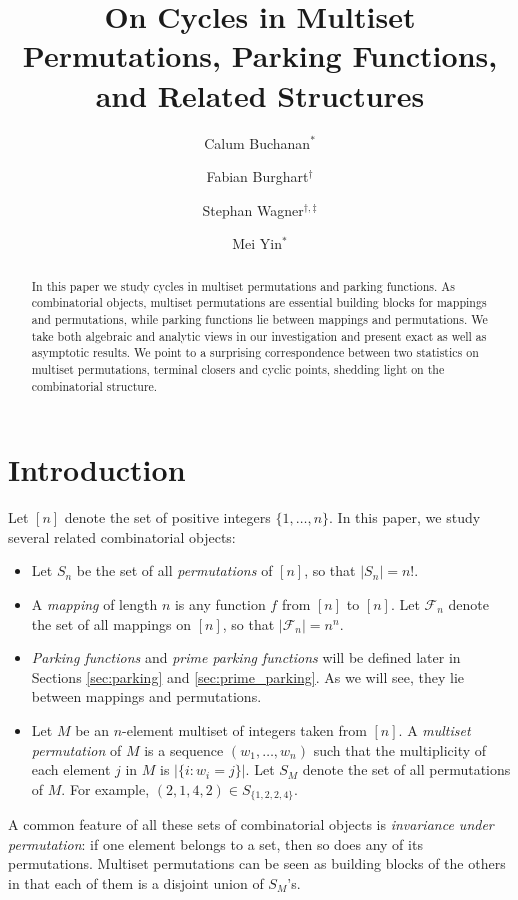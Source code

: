 \documentclass[letterpaper]{amsart}
\title[Cycles in Multiset Permutations and Parking Functions]{On Cycles in Multiset Permutations, Parking Functions, and Related Structures}
\author[C. Buchanan]{Calum {Buchanan}$^*$}
\author[F. Burghart]{Fabian {Burghart}$^\dag$}
\author[S. Wagner]{Stephan {Wagner}$^{\dag, \ddag}$}
\author[M. Yin]{Mei {Yin}$^*$}
\theoremstyle{plain}
\theoremstyle{definition}
\theoremstyle{remark}
\begin{document}
\begin{abstract}
In this paper we study cycles in multiset permutations and parking functions. As combinatorial objects, multiset permutations are essential building blocks for mappings and permutations, while parking functions lie between mappings and permutations. We take both algebraic and analytic views in our investigation and present exact as well as asymptotic results. We point to a surprising correspondence between two statistics on multiset permutations, terminal closers and cyclic points, shedding light on the combinatorial structure.
\end{abstract}

\maketitle

\section{Introduction}
Let $[n]$ denote the set of positive integers $\{1, \dots, n\}$. In this paper, we study several related combinatorial objects:
\begin{itemize}
\item Let $S_n$ be the set of all {\em permutations} of $[n]$, so that $|S_n|=n!$.

\item A {\em mapping} of length $n$ is any function $f$ from $[n]$ to $[n]$. Let $\mathcal{F}_n$ denote the set of all mappings on $[n]$, so that $|\mathcal{F}_n|=n^n$. 

\item \emph{Parking functions} and \emph{prime parking functions} will be defined later in Sections \ref{sec:parking} and \ref{sec:prime_parking}. As we will see, they lie between mappings and permutations.

\item Let $M$ be an $n$-element multiset of integers taken from $[n]$. A {\em multiset permutation} of $M$ is 
a sequence $(w_1, \ldots, w_n)$ 
such that the multiplicity of each element $j$ in $M$ is $|\{i : w_i = j\}|$.
Let $S_M$ denote the set of all permutations of $M$.
For example, $(2,1,4,2) \in S_{\{1,2,2,4\}}$.
\end{itemize}

A common feature of all these sets of combinatorial objects is \emph{invariance under permutation}: if one element belongs to a set, then so does any of its permutations. Multiset permutations can be seen as building blocks of the others in that each of them is a disjoint union of $S_M$'s. 
\end{document}
